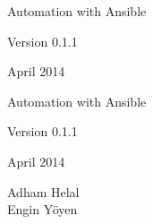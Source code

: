 \documentclass[10pt]{book}
\newcommand{\thetitle}{Automation with Ansible}
\newcommand{\theversion}{0.1.1}
\newcommand{\thedate}{April 2014}
\begin{document}
\begin{latexonly}

\renewcommand{\blankpage}{\thispagestyle{empty} \quad \newpage}




\thispagestyle{empty}

\begin{flushright}
\vspace*{2.0in}

\begin{spacing}{3}
{\huge \thetitle}\\
\end{spacing}

\vspace{0.25in}

Version \theversion

\thedate

\vfill

\end{flushright}


\blankpage
\blankpage


\pagebreak
\thispagestyle{empty}

\begin{flushright}
\vspace*{2.0in}

\begin{spacing}{3}
{\huge \thetitle}\\
\end{spacing}

\vspace{0.25in}

Version \theversion

\thedate

\vspace{1in}


{\Large
Adham Helal\\
Engin Yöyen\\
}


\vspace{0.5in}


\vfill

\end{flushright}



\end{latexonly}
\end{document}
